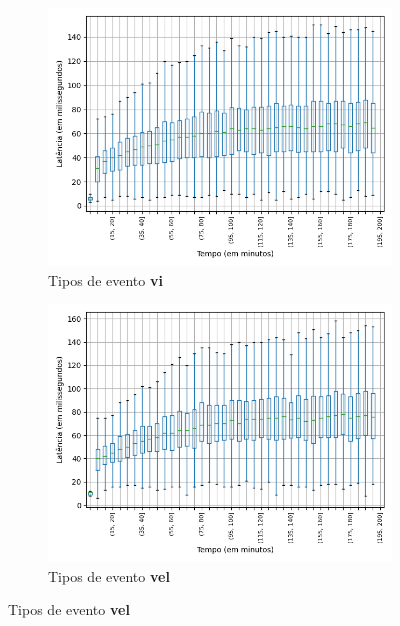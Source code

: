 \begin{figure}
\begin{subfigure}{.5\textwidth}
\centering
\includegraphics[width=\textwidth]{figuras/graphics/boxplot_10-dez-is_vi.png}
\caption{Tipos de evento \textbf{vi}}
\label{fig:BoxPlot_vi_IS_10-dez-is}
\end{subfigure}%
\centering
\begin{subfigure}{.5\textwidth}
\centering
\includegraphics[width=\textwidth]{figuras/graphics/boxplot_10-dez-is_vel.png}
\caption{Tipos de evento \textbf{vel}}
\label{fig:BoxPlot_vel_IS_10-dez-is}
\end{subfigure}%


\end{figure}
